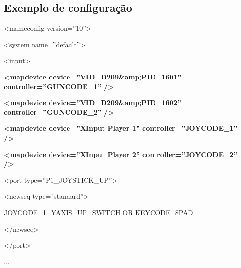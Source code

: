 \documentclass[letterpaper,10pt,brazil]{sphinxmanual}
\begin{document}
\subsection{Exemplo de configuração}
\label{advanced/devicemap:exemplo-de-configuracao}
\begin{DUlineblock}{0em}
\item[] \textless{}mameconfig version=''10''\textgreater{}
\item[]
\begin{DUlineblock}{\DUlineblockindent}
\item[] \textless{}system name=''default''\textgreater{}
\item[]
\begin{DUlineblock}{\DUlineblockindent}
\item[] \textless{}input\textgreater{}
\item[]
\begin{DUlineblock}{\DUlineblockindent}
\item[] \textbf{\textless{}mapdevice device=''VID\_D209\&amp;PID\_1601'' controller=''GUNCODE\_1'' /\textgreater{}}
\item[] \textbf{\textless{}mapdevice device=''VID\_D209\&amp;PID\_1602'' controller=''GUNCODE\_2'' /\textgreater{}}
\item[] \textbf{\textless{}mapdevice device=''XInput Player 1'' controller=''JOYCODE\_1'' /\textgreater{}}
\item[] \textbf{\textless{}mapdevice device=''XInput Player 2'' controller=''JOYCODE\_2'' /\textgreater{}}
\item[] 
\item[] \textless{}port type=''P1\_JOYSTICK\_UP''\textgreater{}
\item[]
\begin{DUlineblock}{\DUlineblockindent}
\item[] \textless{}newseq type=''standard''\textgreater{}
\item[]
\begin{DUlineblock}{\DUlineblockindent}
\item[] JOYCODE\_1\_YAXIS\_UP\_SWITCH OR KEYCODE\_8PAD
\end{DUlineblock}
\item[] \textless{}/newseq\textgreater{}
\end{DUlineblock}
\item[] \textless{}/port\textgreater{}
\item[] ...
\item[] 
\end{DUlineblock}
\end{DUlineblock}
\end{DUlineblock}
\end{DUlineblock}
\end{document}
